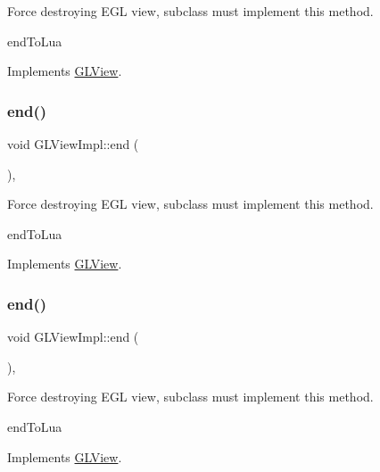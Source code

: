 Force destroying E\+GL view, subclass must implement this method.

end\+To\+Lua 

Implements \hyperlink{classGLView_aaa284e08de7b4e530a2b15b1d27dced0}{G\+L\+View}.

\mbox{\label{classGLViewImpl_ab2d87c9a94b84691ed9ae4ca378745a8}} 
\subsubsection{\texorpdfstring{end()}{end()}\hspace{0.1cm}{\footnotesize\ttfamily [2/9]}}
{\footnotesize\ttfamily void G\+L\+View\+Impl\+::end (\begin{DoxyParamCaption}{ }\end{DoxyParamCaption})\hspace{0.3cm}{\ttfamily [override]}, {\ttfamily [virtual]}}

Force destroying E\+GL view, subclass must implement this method.

end\+To\+Lua 

Implements \hyperlink{classGLView_aaa284e08de7b4e530a2b15b1d27dced0}{G\+L\+View}.

\mbox{\label{classGLViewImpl_ab2d87c9a94b84691ed9ae4ca378745a8}} 
\subsubsection{\texorpdfstring{end()}{end()}\hspace{0.1cm}{\footnotesize\ttfamily [3/9]}}
{\footnotesize\ttfamily void G\+L\+View\+Impl\+::end (\begin{DoxyParamCaption}{ }\end{DoxyParamCaption})\hspace{0.3cm}{\ttfamily [override]}, {\ttfamily [virtual]}}

Force destroying E\+GL view, subclass must implement this method.

end\+To\+Lua 

Implements \hyperlink{classGLView_aaa284e08de7b4e530a2b15b1d27dced0}{G\+L\+View}.

\mbox{\label{classGLViewImpl_a045b39ae9907d0c2d25d49a70e5ce9e4}} 
